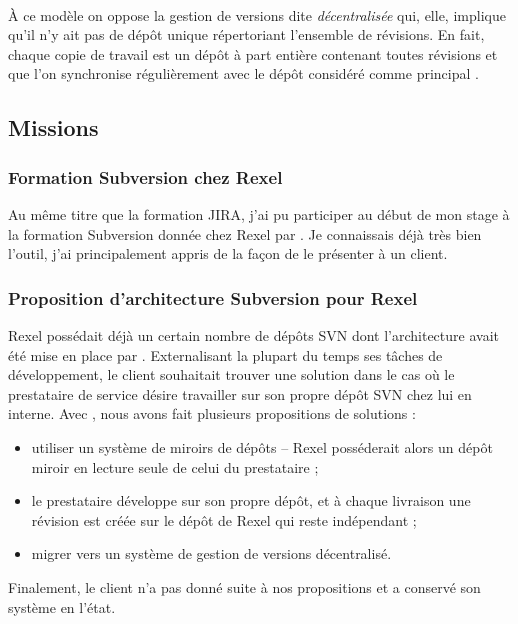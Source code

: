 \paragraph{}
À ce modèle on oppose la gestion de versions dite \emph{décentralisée} qui, elle, implique qu'il n'y ait pas de dépôt unique répertoriant l'ensemble de révisions.
En fait, chaque copie de travail est un dépôt à part entière contenant toutes révisions et que l'on synchronise régulièrement avec le dépôt considéré comme \og principal \fg.



\subsection{Missions}

\subsubsection{Formation Subversion chez Rexel}

Au même titre que la formation JIRA, j'ai pu participer au début de mon stage à la formation Subversion donnée chez Rexel par \agulet.
Je connaissais déjà très bien l'outil, j'ai principalement appris de la façon de le présenter à un client.



\subsubsection{Proposition d'architecture Subversion pour Rexel}

Rexel possédait déjà un certain nombre de dépôts SVN dont l'architecture avait été mise en place par \asmile.
Externalisant la plupart du temps ses tâches de développement, le client souhaitait trouver une solution dans le cas où le prestataire de service désire travailler sur son propre dépôt SVN chez lui en interne.
Avec \agulet, nous avons fait plusieurs propositions de solutions :
\begin{itemize}
	\item utiliser un système de miroirs de dépôts -- Rexel posséderait alors un dépôt miroir en lecture seule de celui du prestataire ;
	\item le prestataire développe sur son propre dépôt, et à chaque livraison une révision est créée sur le dépôt de Rexel qui reste indépendant ;
	\item migrer vers un système de gestion de versions décentralisé.
\end{itemize}

Finalement, le client n'a pas donné suite à nos propositions et a conservé son système en l'état.

